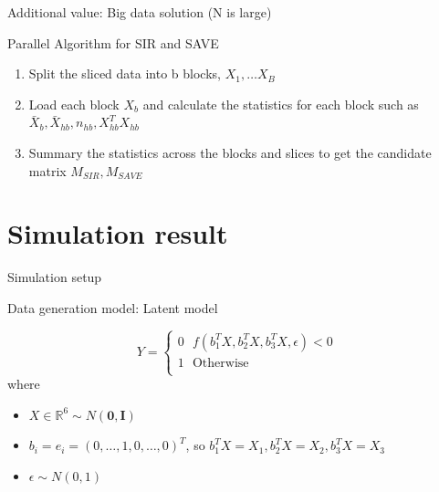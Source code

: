 \documentclass[ignorenonframetext,]{beamer}
\providecommand{\tightlist}{%
  \setlength{\itemsep}{0pt}\setlength{\parskip}{0pt}}
\begin{document}
\begin{frame}{Additional value: Big data solution (N is large)}

\begin{block}{Parallel Algorithm for SIR and SAVE}

\begin{enumerate}
\def\labelenumi{\arabic{enumi}.}
\tightlist
\item
  Split the sliced data into b blocks, \(X_1, \dots X_B\)\\
\item
  Load each block \(X_b\) and calculate the statistics for each block
  such as \(\bar{X}_b, \bar{X}_{hb}, n_{hb}, X^T_{hb}X_{hb}\)\\
\item
  Summary the statistics across the blocks and slices to get the
  candidate matrix \(M_{SIR}, M_{SAVE}\)
\end{enumerate}

\end{block}

\end{frame}

\section{Simulation result}\label{simulation-result}

\begin{frame}{Simulation setup}

\begin{block}{Data generation model: Latent model}

\[
    Y=\left\{
                \begin{array}{ll}
                  0 ~~~f(b_1^TX,b_2^TX, b_3^TX, \epsilon) < 0 \\
                  1 ~~~\text{Otherwise} \\
                \end{array}
      \right. 
\] where

\begin{itemize}
\tightlist
\item
  \(X \in \mathbb{R}^6 \sim N(\mathbf 0, \mathbf I)\)\\
\item
  \(b_i = e_i = (0,\dots, 1,0,\dots,0)^T\), so
  \(b_1^TX = X_1, b_2^TX = X_2, b_3^TX = X_3\)
\item
  \(\epsilon \sim N(0,1)\)
\end{itemize}

\end{block}

\end{frame}
\end{document}
